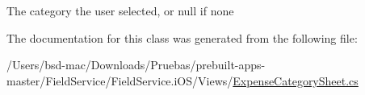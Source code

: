 The category the user selected, or null if none 



The documentation for this class was generated from the following file\+:\begin{DoxyCompactItemize}
\item 
/\+Users/bsd-\/mac/\+Downloads/\+Pruebas/prebuilt-\/apps-\/master/\+Field\+Service/\+Field\+Service.\+i\+O\+S/\+Views/\hyperlink{_expense_category_sheet_8cs}{Expense\+Category\+Sheet.\+cs}\end{DoxyCompactItemize}
